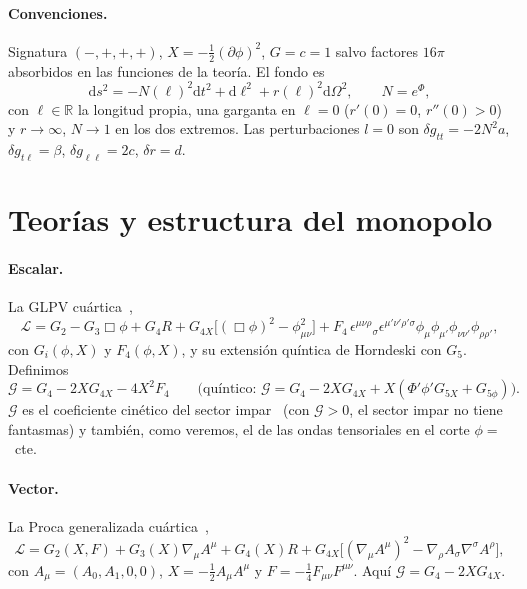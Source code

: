 \documentclass[11pt,a4paper]{article}
\theoremstyle{remark}
\newcommand{\G}{\mathcal G}
\newcommand{\dd}{\mathrm d}
\begin{document}
\paragraph{Convenciones.} Signatura $(-,+,+,+)$, $X=-\tfrac12(\partial\phi)^2$, $G=c=1$ salvo factores $16\pi$ absorbidos en las funciones de la teoría. El fondo es
\begin{equation}
\dd s^2=-N(\ell)^2\dd t^2+\dd\ell^2+r(\ell)^2\dd\Omega^2,\qquad N=e^{\Phi},
\label{eq:fondo}
\end{equation}
con $\ell\in\mathbb R$ la longitud propia, una garganta en $\ell=0$ ($r'(0)=0$, $r''(0)>0$) y $r\to\infty$, $N\to1$ en los dos extremos. Las perturbaciones $l=0$ son $\delta g_{tt}=-2N^2a$, $\delta g_{t\ell}=\beta$, $\delta g_{\ell\ell}=2c$, $\delta r=d$.

\section{Teorías y estructura del monopolo}\label{sec:marco}

\paragraph{Escalar.} La GLPV cuártica~\cite{GLPV,Kobayashi},
\begin{equation}
\mathcal L=G_2-G_3\Box\phi+G_4R+G_{4X}\big[(\Box\phi)^2-\phi_{\mu\nu}^2\big]+F_4\,\epsilon^{\mu\nu\rho}{}_{\sigma}\epsilon^{\mu'\nu'\rho'\sigma}\phi_\mu\phi_{\mu'}\phi_{\nu\nu'}\phi_{\rho\rho'},
\label{eq:GLPV}
\end{equation}
con $G_i(\phi,X)$ y $F_4(\phi,X)$, y su extensión quíntica de Horndeski con $G_5$. Definimos
\begin{equation}
\G=G_4-2XG_{4X}-4X^2F_4\qquad\big(\text{quíntico: }\G=G_4-2XG_{4X}+X(\Phi'\phi'G_{5X}+G_{5\phi})\big).
\label{eq:Gcal}
\end{equation}
$\G$ es el coeficiente cinético del sector impar~\cite{KMS1} (con $\G>0$, el sector impar no tiene fantasmas) y también, como veremos, el de las ondas tensoriales en el corte $\phi=$~cte.

\paragraph{Vector.} La Proca generalizada cuártica~\cite{Heisenberg},
\begin{equation}
\mathcal L=G_2(X,F)+G_3(X)\nabla_\mu A^\mu+G_4(X)R+G_{4X}\big[(\nabla_\mu A^\mu)^2-\nabla_\rho A_\sigma\nabla^\sigma A^\rho\big],
\end{equation}
con $A_\mu=(A_0,A_1,0,0)$, $X=-\tfrac12A_\mu A^\mu$ y $F=-\tfrac14F_{\mu\nu}F^{\mu\nu}$. Aquí $\G=G_4-2XG_{4X}$.
\end{document}
